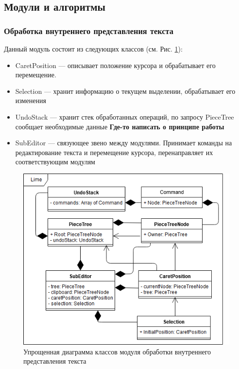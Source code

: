 \documentclass{fefu}
\begin{document}
		\subsection{Модули и алгоритмы}
			\subsubsection{Обработка внутреннего представления текста}
				\par Данный модуль состоит из следующих классов (см. Рис. 
				\ref{diag:SubEditorScheme}):
				\begin{itemize}
					\item CaretPosition --- описывает положение курсора и 
					обрабатывает его перемещение.
					\item Selection --- хранит информацию о текущем выделении, обрабатывает его
					изменения
					\item UndoStack --- хранит стек обработанных операций, по запросу PieceTree 
					сообщает необходимые данные \textbf{Где-то написать о принципе работы}
					\item SubEditor --- связующее звено между модулями. Принимает команды на 
					редактирование текста и перемещение курсора, перенаправляет их
					соответствующим модулям
				\end{itemize}
				\begin{figure}[h]
					\centering
					\includegraphics[width=1\linewidth]{diagrams/SubEditorScheme.png}
					\caption{Упрощенная диаграмма классов модуля обработки внутреннего представления 
					текста}
					\label{diag:SubEditorScheme}
				\end{figure}
\end{document}
